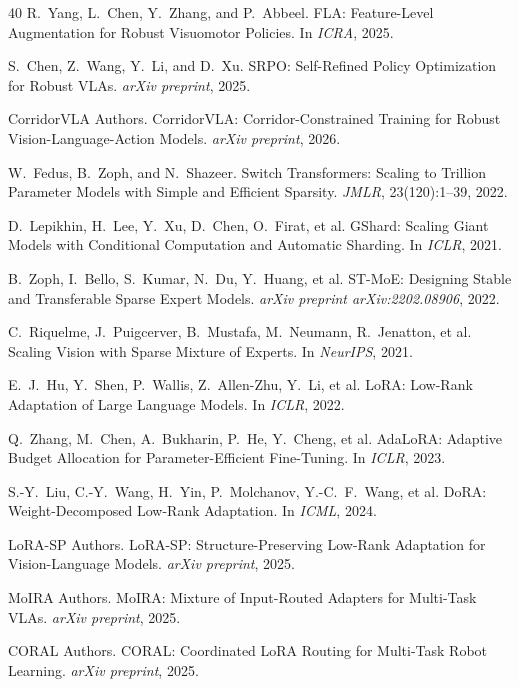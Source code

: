 \documentclass[10pt,twocolumn]{article}
\begin{document}
{\begin{thebibliography}{40}
R.~Yang, L.~Chen, Y.~Zhang, and P.~Abbeel.
\newblock FLA: Feature-Level Augmentation for Robust Visuomotor Policies.
\newblock In \emph{ICRA}, 2025.

S.~Chen, Z.~Wang, Y.~Li, and D.~Xu.
\newblock SRPO: Self-Refined Policy Optimization for Robust VLAs.
\newblock \emph{arXiv preprint}, 2025.

CorridorVLA Authors.
\newblock CorridorVLA: Corridor-Constrained Training for Robust Vision-Language-Action Models.
\newblock \emph{arXiv preprint}, 2026.

W.~Fedus, B.~Zoph, and N.~Shazeer.
\newblock Switch Transformers: Scaling to Trillion Parameter Models with Simple and Efficient Sparsity.
\newblock \emph{JMLR}, 23(120):1--39, 2022.

D.~Lepikhin, H.~Lee, Y.~Xu, D.~Chen, O.~Firat, et al.
\newblock GShard: Scaling Giant Models with Conditional Computation and Automatic Sharding.
\newblock In \emph{ICLR}, 2021.

B.~Zoph, I.~Bello, S.~Kumar, N.~Du, Y.~Huang, et al.
\newblock ST-MoE: Designing Stable and Transferable Sparse Expert Models.
\newblock \emph{arXiv preprint arXiv:2202.08906}, 2022.

C.~Riquelme, J.~Puigcerver, B.~Mustafa, M.~Neumann, R.~Jenatton, et al.
\newblock Scaling Vision with Sparse Mixture of Experts.
\newblock In \emph{NeurIPS}, 2021.

E.~J.~Hu, Y.~Shen, P.~Wallis, Z.~Allen-Zhu, Y.~Li, et al.
\newblock LoRA: Low-Rank Adaptation of Large Language Models.
\newblock In \emph{ICLR}, 2022.

Q.~Zhang, M.~Chen, A.~Bukharin, P.~He, Y.~Cheng, et al.
\newblock AdaLoRA: Adaptive Budget Allocation for Parameter-Efficient Fine-Tuning.
\newblock In \emph{ICLR}, 2023.

S.-Y.~Liu, C.-Y.~Wang, H.~Yin, P.~Molchanov, Y.-C.~F.~Wang, et al.
\newblock DoRA: Weight-Decomposed Low-Rank Adaptation.
\newblock In \emph{ICML}, 2024.

LoRA-SP Authors.
\newblock LoRA-SP: Structure-Preserving Low-Rank Adaptation for Vision-Language Models.
\newblock \emph{arXiv preprint}, 2025.

MoIRA Authors.
\newblock MoIRA: Mixture of Input-Routed Adapters for Multi-Task VLAs.
\newblock \emph{arXiv preprint}, 2025.

CORAL Authors.
\newblock CORAL: Coordinated LoRA Routing for Multi-Task Robot Learning.
\newblock \emph{arXiv preprint}, 2025.

\end{thebibliography}
}
\end{document}
